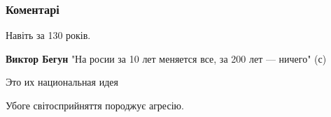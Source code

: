  
 
 
 
 
\subsubsection{Коментарі}

\begin{itemize}
 
Навіть за 130 років.
\begin{itemize}
 
\textbf{Виктор Бегун} "На росии за 10 лет меняется все, за 200 лет — ничего" (с)
\end{itemize}

 
Это их национальная идея🤣

 
Убоге світосприйняття породжує агресію.

 

\end{itemize}
